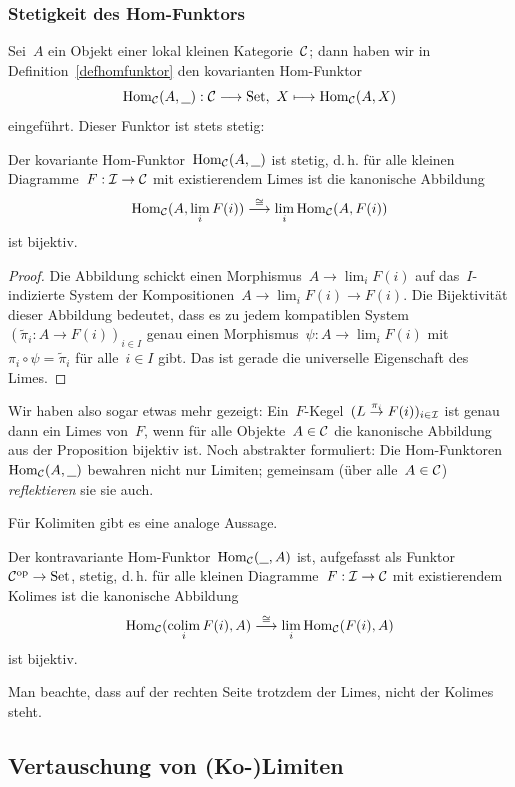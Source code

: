 \subsubsection{Stetigkeit des Hom-Funktors}

Sei~$A$ ein Objekt einer lokal kleinen Kategorie~$\mathcal{C}$; dann haben wir in
Definition~\ref{defhomfunktor} den kovarianten Hom-Funktor
\[ \mathrm{Hom}_{\mathcal{C}}(A, \underline{\ \ }) : \mathcal{C} \longrightarrow \mathrm{Set},\ X \longmapsto \mathrm{Hom}_{\mathcal{C}}(A,X) \]
eingeführt. Dieser Funktor ist stets stetig:
\begin{prop}\label{homstetig}Der kovariante Hom-Funktor~$\mathrm{Hom}_{\mathcal{C}}(A,\underline{\ \ })$ ist stetig, d.\,h.
für alle kleinen Diagramme~$F : \mathcal{I} \to \mathcal{C}$ mit existierendem Limes ist die
kanonische Abbildung
\[ \mathrm{Hom}_{\mathcal{C}}(A, \lim_i F(i)) \stackrel{\cong}{\longrightarrow} \lim_i \mathrm{Hom}_{\mathcal{C}}(A, F(i)) \]
ist bijektiv.
\end{prop}
\begin{proof}
Die Abbildung schickt einen Morphismus~$A \to \lim_i F(i)$ auf
das~$I$-indizierte System der Kompositionen~$A \to \lim_i F(i) \to F(i)$. Die
Bijektivität dieser Abbildung bedeutet, dass es zu jedem kompatiblen
System~$(\widetilde \pi_i : A \to F(i))_{i \in I}$ genau einen Morphismus~$\psi : A \to
\lim_i F(i)$ mit~$\pi_i \circ \psi = \widetilde \pi_i$ für alle~$i \in
I$ gibt. Das ist gerade die universelle Eigenschaft des Limes.
\end{proof}
Wir haben also sogar etwas mehr gezeigt: Ein~$F$-Kegel~$(L
\stackrel{\pi_i}{\to} F(i))_{i \in \mathcal{I}}$ ist genau dann ein Limes von~$F$, wenn
für alle Objekte~$A \in \mathcal{C}$ die kanonische Abbildung aus der Proposition
bijektiv ist. Noch abstrakter formuliert: Die
Hom-Funktoren~$\mathrm{Hom}_{\mathcal{C}}(A,\underline{\ \ })$ bewahren nicht nur Limiten; gemeinsam (über
alle~$A \in \mathcal{C}$) \emph{reflektieren} sie sie auch.

Für Kolimiten gibt es eine analoge Aussage.
\begin{prop}\label{homkostetig}Der kontravariante
Hom-Funktor~$\mathrm{Hom}_{\mathcal{C}}(\underline{\ \ },A)$ ist, aufgefasst als Funktor~$\mathcal{C}^{\mathrm{op}} \to
\mathrm{Set}$, stetig, d.\,h. für alle kleinen Diagramme~$F : \mathcal{I} \to \mathcal{C}$ mit
existierendem Kolimes ist die kanonische Abbildung
\[ \mathrm{Hom}_{\mathcal{C}}(\operatorname*{colim}_i F(i), A) \stackrel{\cong}{\longrightarrow} \lim_i \mathrm{Hom}_{\mathcal{C}}(F(i), A) \]
ist bijektiv.
\end{prop}
Man beachte, dass auf der rechten Seite trotzdem der Limes, nicht der Kolimes
steht.


\subsection{Vertauschung von (Ko-)Limiten}

